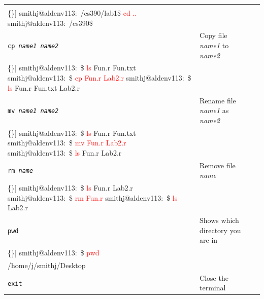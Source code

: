 \begin{table}[htbp]
\begin{tabular}{l|p{1.5in}|p{2.5in}}
\begin{minipage}{2.5in}
\begin{Verbatim}[commandchars=\\\{\}]
smithj@aldenv113:~/cs390/lab1\$ \textcolor{red}{cd ..}
smithj@aldenv113:~/cs390\$
\end{Verbatim}
\end{minipage}\\\hline
\rule{0em}{4.5em}\tt cp {\rm \em name1 name2} & Copy file {\em name1} to {\em name2}&
\begin{minipage}{2.5in}
\begin{Verbatim}[commandchars=\\\{\}]
smithj@aldenv113:~\$ \textcolor{red}{ls}
Fun.r Fun.txt
smithj@aldenv113:~\$ \textcolor{red}{cp Fun.r Lab2.r}
smithj@aldenv113:~\$ \textcolor{red}{ls}
Fun.r Fun.txt Lab2.r
\end{Verbatim}
\end{minipage}\\\hline
\rule{0em}{4.5em}\tt mv {\rm \em name1 name2} & Rename file {\em name1} as {\em name2}&
\begin{minipage}{2.5in}
\begin{Verbatim}[commandchars=\\\{\}]
smithj@aldenv113:~\$ \textcolor{red}{ls}
Fun.r Fun.txt
smithj@aldenv113:~\$ \textcolor{red}{mv Fun.r Lab2.r}
smithj@aldenv113:~\$ \textcolor{red}{ls}
Fun.r Lab2.r
\end{Verbatim}
\end{minipage}\\\hline
\rule{0em}{4.5em}\tt rm {\rm \em name} & Remove file {\em name}&
\begin{minipage}{2.5in}
\begin{Verbatim}[commandchars=\\\{\}]
smithj@aldenv113:~\$ \textcolor{red}{ls}
Fun.r Lab2.r
smithj@aldenv113:~\$ \textcolor{red}{rm Fun.r}
smithj@aldenv113:~\$ \textcolor{red}{ls}
Lab2.r
\end{Verbatim}
\end{minipage}\\
\hline
\rule{0em}{3.5em}\tt pwd & Shows which directory you are in &
\begin{minipage}{2.5in}
\begin{Verbatim}[commandchars=\\\{\}]
smithj@aldenv113:~\$ \textcolor{red}{pwd} \\
/home/j/smithj/Desktop
\end{Verbatim}
\end{minipage}\\
\hline
\rule{0em}{1.5em}\tt exit  & Close the terminal  &\\
\hline
\end{tabular}
\end{table}


